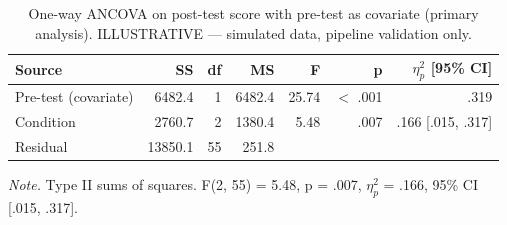 \begin{table}[htbp]
\centering
\small
\caption{One-way ANCOVA on post-test score with pre-test as covariate (primary analysis). ILLUSTRATIVE — simulated data, pipeline validation only.}
\label{tab:T04}
\begin{tabular}{lrrrrrr}
\toprule
Source & SS & df & MS & F & p & $\eta^2_p$ [95\% CI] \\
\midrule
Pre-test (covariate) & 6482.4 & 1 & 6482.4 & 25.74 & $<$ .001 & .319 \\
Condition & 2760.7 & 2 & 1380.4 & 5.48 & .007 & .166 [.015, .317] \\
Residual & 13850.1 & 55 & 251.8 &  &  &  \\
\bottomrule
\end{tabular}
\par\smallskip\footnotesize\textit{Note.} Type II sums of squares. F(2, 55) = 5.48, p = .007, $\eta^2_p$ = .166, 95\% CI [.015, .317].
\end{table}
